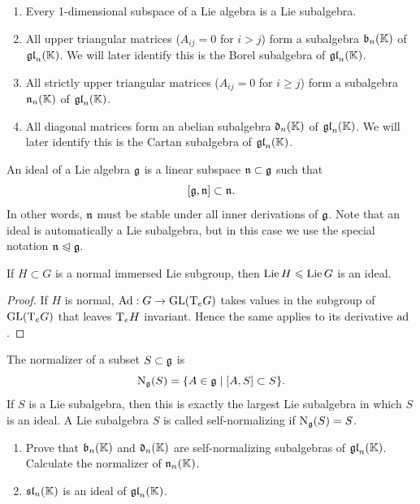 \begin{example}
    \begin{enumerate}
        \item Every 1-dimensional subspace of a Lie algebra is a Lie subalgebra.
        \item All upper triangular matrices ($A_{ij}=0$ for $i>j$) form a subalgebra $\mathfrak{b}_n(\mathbb{K})$ of $\mathfrak{gl}_n(\mathbb{K})$. We will later identify this is the Borel subalgebra of $\mathfrak{gl}_n(\mathbb{K})$.
        \item All strictly upper triangular matrices ($A_{ij}=0$ for $i\geq j$) form a subalgebra $\mathfrak{n}_n(\mathbb{K})$ of $\mathfrak{gl}_n(\mathbb{K})$.
        \item All diagonal matrices form an abelian subalgebra $\mathfrak{d}_n(\mathbb{K})$ of $\mathfrak{gl}_n(\mathbb{K})$. We will later identify this is the Cartan subalgebra of $\mathfrak{gl}_n(\mathbb{K})$.
    \end{enumerate}
\end{example}



\begin{defn}[Ideal]
    An ideal of a Lie algebra $\mathfrak{g}$ is a linear subspace $\mathfrak{n}\subset\mathfrak{g}$ such that
    \[[\mathfrak{g},\mathfrak{n}]\subset \mathfrak{n}.\]
    In other words, $\mathfrak{n}$ must be stable under all inner derivations of $\mathfrak{g}$. Note that an ideal is automatically a Lie subalgebra, but in this case we use the special notation $\mathfrak{n}\trianglelefteqslant \mathfrak{g}$.
\end{defn}

\begin{prop}
    If $H\subset G$ is a normal immersed Lie subgroup, then $\operatorname{Lie} H\leqslant \operatorname{Lie} G$ is an ideal.
\end{prop}
\begin{proof}
    If $H$ is normal, $\mathrm{Ad}:G\to \operatorname{GL}(\mathrm{T}_eG)$ takes values in the subgroup of $\operatorname{GL}(\mathrm{T}_eG)$ that leaves $\mathrm{T}_e H$ invariant. Hence the same applies to its derivative $\mathrm{ad}$.
\end{proof}

\begin{defn}
    The normalizer of a subset $S\subset \mathfrak{g}$ is
    \[\mathrm{N}_{\mathfrak{g}}(S)=\{A\in\mathfrak{g}\mid [A,S]\subset S\}.\]
    If $S$ is a Lie subalgebra, then this is exactly the largest Lie subalgebra in which $S$ is an ideal. A Lie subalgebra $S$ is called self-normalizing if $\mathrm{N}_{\mathfrak{g}}(S)=S$.
\end{defn}

\begin{xca}
    \begin{enumerate}
         \item Prove that $\mathfrak{b}_n(\mathbb{K})$ and $\mathfrak{d}_n(\mathbb{K})$ are self-normalizing subalgebras of $\mathfrak{gl}_n(\mathbb{K})$. Calculate the normalizer of $\mathfrak{n}_n(\mathbb{K})$.
         \item $\mathfrak{sl}_n(\mathbb{K})$ is an ideal of $\mathfrak{gl}_n(\mathbb{K})$.
    \end{enumerate}
\end{xca}

